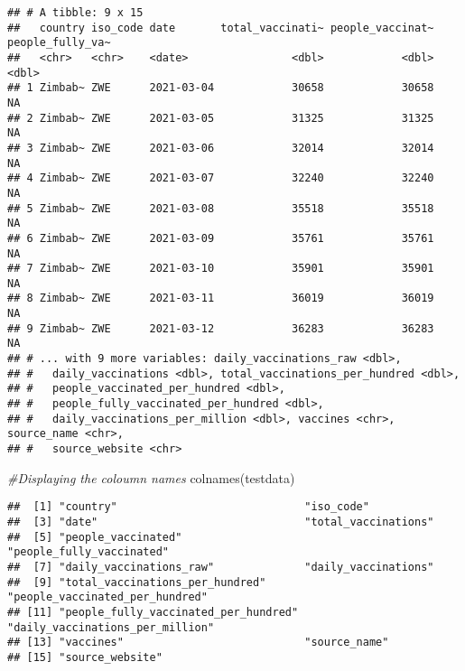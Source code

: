 \documentclass[
]{article}
\newenvironment{Shaded}{\begin{snugshade}}{\end{snugshade}}
\newcommand{\CommentTok}[1]{\textcolor[rgb]{0.56,0.35,0.01}{\textit{#1}}}
\newcommand{\FunctionTok}[1]{\textcolor[rgb]{0.00,0.00,0.00}{#1}}
\newcommand{\NormalTok}[1]{#1}
\newcommand{\SpecialCharTok}[1]{\textcolor[rgb]{0.00,0.00,0.00}{#1}}
\begin{document}
\begin{verbatim}
## # A tibble: 9 x 15
##   country iso_code date       total_vaccinati~ people_vaccinat~ people_fully_va~
##   <chr>   <chr>    <date>                <dbl>            <dbl>            <dbl>
## 1 Zimbab~ ZWE      2021-03-04            30658            30658               NA
## 2 Zimbab~ ZWE      2021-03-05            31325            31325               NA
## 3 Zimbab~ ZWE      2021-03-06            32014            32014               NA
## 4 Zimbab~ ZWE      2021-03-07            32240            32240               NA
## 5 Zimbab~ ZWE      2021-03-08            35518            35518               NA
## 6 Zimbab~ ZWE      2021-03-09            35761            35761               NA
## 7 Zimbab~ ZWE      2021-03-10            35901            35901               NA
## 8 Zimbab~ ZWE      2021-03-11            36019            36019               NA
## 9 Zimbab~ ZWE      2021-03-12            36283            36283               NA
## # ... with 9 more variables: daily_vaccinations_raw <dbl>,
## #   daily_vaccinations <dbl>, total_vaccinations_per_hundred <dbl>,
## #   people_vaccinated_per_hundred <dbl>,
## #   people_fully_vaccinated_per_hundred <dbl>,
## #   daily_vaccinations_per_million <dbl>, vaccines <chr>, source_name <chr>,
## #   source_website <chr>
\end{verbatim}

\begin{Shaded}
\begin{Highlighting}[]
\CommentTok{\#Displaying the coloumn names}
\FunctionTok{colnames}\NormalTok{(testdata)}
\end{Highlighting}
\end{Shaded}

\begin{verbatim}
##  [1] "country"                             "iso_code"                           
##  [3] "date"                                "total_vaccinations"                 
##  [5] "people_vaccinated"                   "people_fully_vaccinated"            
##  [7] "daily_vaccinations_raw"              "daily_vaccinations"                 
##  [9] "total_vaccinations_per_hundred"      "people_vaccinated_per_hundred"      
## [11] "people_fully_vaccinated_per_hundred" "daily_vaccinations_per_million"     
## [13] "vaccines"                            "source_name"                        
## [15] "source_website"
\end{verbatim}

\begin{Shaded}
\end{Shaded}
\end{document}
